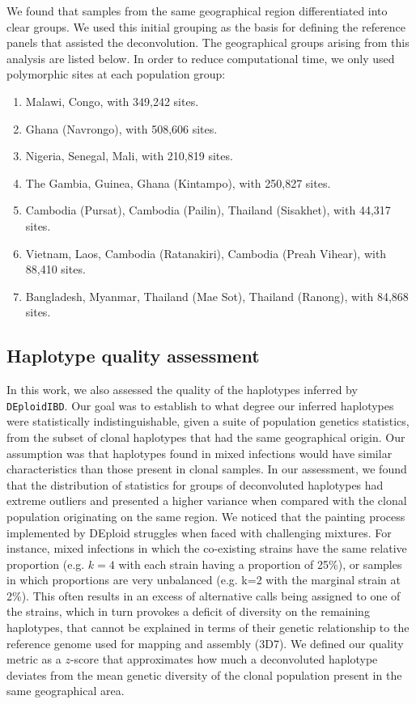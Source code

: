 \documentclass[9pt,lineno]{elife}
\begin{document}
\begin{appendixbox}
We found that samples from the same geographical region differentiated into clear groups. We used this initial grouping as the basis for defining the reference panels that assisted the deconvolution. The geographical groups arising from this analysis are listed below. In order to reduce computational time, we only used polymorphic sites at each population group:
\begin{enumerate}
  \item Malawi, Congo, with 349,242 sites.
  \item Ghana (Navrongo), with 508,606 sites.
  \item Nigeria, Senegal, Mali, with 210,819 sites.
  \item The Gambia, Guinea, Ghana (Kintampo), with 250,827 sites.
  \item Cambodia (Pursat), Cambodia (Pailin), Thailand (Sisakhet), with 44,317 sites.
  \item Vietnam, Laos, Cambodia (Ratanakiri), Cambodia (Preah Vihear), with 88,410 sites.
  \item Bangladesh, Myanmar, Thailand (Mae Sot), Thailand (Ranong), with 84,868 sites.
\end{enumerate}


\subsection{Haplotype quality assessment}
\label{section:hap-quality}
In this work, we also assessed the quality of the haplotypes inferred by \texttt{DEploidIBD}. Our goal was to establish to what degree our inferred haplotypes were statistically indistinguishable, given a suite of population genetics statistics, from the subset of clonal haplotypes that had the same geographical origin. Our assumption was that haplotypes found in mixed infections would have similar characteristics than those present in clonal samples. In our assessment, we found that the distribution of statistics for groups of deconvoluted haplotypes had extreme outliers and presented a higher variance when compared with the clonal population originating on the same region. We noticed that the painting process implemented by DEploid struggles when faced with challenging mixtures. For instance, mixed infections in which the co-existing strains have the same relative proportion (e.g. $k=4$ with each strain having a proportion of 25\%), or samples in which proportions are very unbalanced (e.g. k=2 with the marginal strain at 2\%). This often results in an excess of alternative calls being assigned to one of the strains, which in turn provokes a deficit of diversity on the remaining haplotypes, that cannot be explained in terms of their genetic relationship to the reference genome used for mapping and assembly (3D7). We defined our quality metric as a $z$-score that approximates how much a deconvoluted haplotype deviates from the mean genetic diversity of the clonal population present in the same geographical area.


\end{appendixbox}
\end{document}
